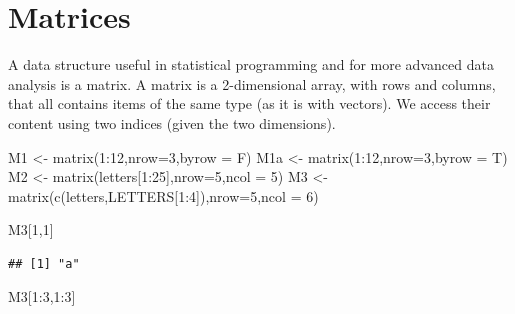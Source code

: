 \documentclass[
]{book}
\newenvironment{Shaded}{\begin{snugshade}}{\end{snugshade}}
\newcommand{\AttributeTok}[1]{\textcolor[rgb]{0.77,0.63,0.00}{#1}}
\newcommand{\DecValTok}[1]{\textcolor[rgb]{0.00,0.00,0.81}{#1}}
\newcommand{\FunctionTok}[1]{\textcolor[rgb]{0.00,0.00,0.00}{#1}}
\newcommand{\NormalTok}[1]{#1}
\newcommand{\OtherTok}[1]{\textcolor[rgb]{0.56,0.35,0.01}{#1}}
\newcommand{\SpecialCharTok}[1]{\textcolor[rgb]{0.00,0.00,0.00}{#1}}
\begin{document}
\hypertarget{matrices}{%
\section*{Matrices}\label{matrices}}

A data structure useful in statistical programming and for more advanced data analysis is a matrix. A matrix is a 2-dimensional array, with rows and columns, that all contains items of the same type (as it is with vectors). We access their content using two indices (given the two dimensions).

\begin{Shaded}
\begin{Highlighting}[]
\NormalTok{M1 }\OtherTok{\textless{}{-}} \FunctionTok{matrix}\NormalTok{(}\DecValTok{1}\SpecialCharTok{:}\DecValTok{12}\NormalTok{,}\AttributeTok{nrow=}\DecValTok{3}\NormalTok{,}\AttributeTok{byrow =}\NormalTok{ F) }
\NormalTok{M1a }\OtherTok{\textless{}{-}} \FunctionTok{matrix}\NormalTok{(}\DecValTok{1}\SpecialCharTok{:}\DecValTok{12}\NormalTok{,}\AttributeTok{nrow=}\DecValTok{3}\NormalTok{,}\AttributeTok{byrow =}\NormalTok{ T)    }
\NormalTok{M2 }\OtherTok{\textless{}{-}} \FunctionTok{matrix}\NormalTok{(letters[}\DecValTok{1}\SpecialCharTok{:}\DecValTok{25}\NormalTok{],}\AttributeTok{nrow=}\DecValTok{5}\NormalTok{,}\AttributeTok{ncol =} \DecValTok{5}\NormalTok{) }
\NormalTok{M3 }\OtherTok{\textless{}{-}} \FunctionTok{matrix}\NormalTok{(}\FunctionTok{c}\NormalTok{(letters,LETTERS[}\DecValTok{1}\SpecialCharTok{:}\DecValTok{4}\NormalTok{]),}\AttributeTok{nrow=}\DecValTok{5}\NormalTok{,}\AttributeTok{ncol =} \DecValTok{6}\NormalTok{)   }
\end{Highlighting}
\end{Shaded}

\begin{Shaded}
\begin{Highlighting}[]
\NormalTok{M3[}\DecValTok{1}\NormalTok{,}\DecValTok{1}\NormalTok{] }
\end{Highlighting}
\end{Shaded}

\begin{verbatim}
## [1] "a"
\end{verbatim}

\begin{Shaded}
\begin{Highlighting}[]
\NormalTok{M3[}\DecValTok{1}\SpecialCharTok{:}\DecValTok{3}\NormalTok{,}\DecValTok{1}\SpecialCharTok{:}\DecValTok{3}\NormalTok{] }
\end{Highlighting}
\end{Shaded}
\end{document}
